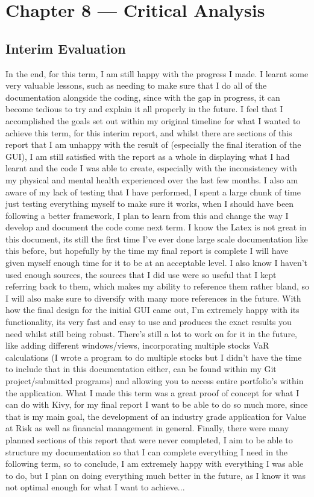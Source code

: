 \documentclass{article}
\begin{document}
\newpage
\section{Chapter 8 --- Critical Analysis}

\subsection{Interim Evaluation}
In the end, for this term, I am still happy with the progress I made. I learnt some very valuable lessons, such as needing to make sure that I do all of the documentation alongside the coding, since with the gap in progress, it can become tedious to try and explain it all properly in the future. I feel that I accomplished the goals set out within my original timeline for what I wanted to achieve this term, for this interim report, and whilst there are sections of this report that I am unhappy with the result of (especially the final iteration of the GUI), I am still satisfied with the report as a whole in displaying what I had learnt and the code I was able to create, especially with the inconsistency with my physical and mental health experienced over the last few months. I also am aware of my lack of testing that I have performed, I spent a large chunk of time just testing everything myself to make sure it works, when I should have been following a better framework, I plan to learn from this and change the way I develop and document the code come next term. I know the Latex is not great in this document, its still the first time I've ever done large scale documentation like this before, but hopefully by the time my final report is complete I will have given myself enough time for it to be at an acceptable level. I also know I haven't used enough sources, the sources that I did use were so useful that I kept referring back to them, which makes my ability to reference them rather bland, so I will also make sure to diversify with many more references in the future. With how the final design for the initial GUI came out, I'm extremely happy with its functionality, its very fast and easy to use and produces the exact results you need whilst still being robust. There's still a lot to work on for it in the future, like adding different windows/views, incorporating multiple stocks VaR calculations (I wrote a program to do multiple stocks but I didn't have the time to include that in this documentation either, can be found within my Git project/submitted programs) and allowing you to access entire portfolio's within the application. What I made this term was a great proof of concept for what I can do with Kivy, for my final report I want to be able to do so much more, since that is my main goal, the development of an industry grade application for Value at Risk as well as financial management in general. Finally, there were many planned sections of this report that were never completed, I aim to be able to structure my documentation so that I can complete everything I need in the following term, so to conclude, I am extremely happy with everything I was able to do, but I plan on doing everything much better in the future, as I know it was not optimal enough for what I want to achieve...
\end{document}
